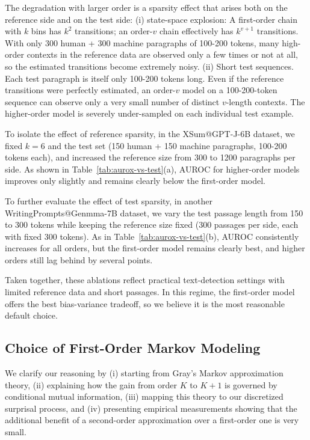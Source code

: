 \documentclass{article}
\theoremstyle{plain}
\theoremstyle{definition}
\theoremstyle{remark}
\begin{document}
The degradation with larger order is a sparsity effect that arises both on the reference side and on the test side: (i) state-space explosion: A first-order chain with $k$ bins has $k^2$ transitions; an order-$v$ chain effectively has $k^{v+1}$ transitions. With only 300 human + 300 machine paragraphs of 100-200 tokens, many high-order contexts in the reference data are observed only a few times or not at all, so the estimated transitions become extremely noisy. (ii) Short test sequences. Each test paragraph is itself only 100-200 tokens long. Even if the reference transitions were perfectly estimated, an order-$v$ model on a 100-200-token sequence can observe only a very small number of distinct 
$v$-length contexts. The higher-order model is severely under-sampled on each individual test example.

To isolate the effect of reference sparsity, in the XSum@GPT-J-6B dataset, we fixed $k=6$ and the test set (150 human + 150 machine paragraphs, 100-200 tokens each), and increased the reference size from 300 to 1200 paragraphs per side. As shown in Table~\ref{tab:aurox-vs-test}(a), AUROC for higher-order models improves only slightly and remains clearly below the first-order model.

To further evaluate the effect of test sparsity, in another WritingPrompts@Genmma-7B dataset, we vary the test passage length from 150 to 300 tokens while keeping the reference size fixed (300 passages per side, each with fixed 300 tokens). As in Table~\ref{tab:aurox-vs-test}(b), AUROC consistently increases for all orders, but the first-order model remains clearly best, and higher orders still lag behind by several points. 

Taken together, these ablations reflect practical text-detection settings with limited reference data and short passages. In this regime, the first-order model offers the best bias-variance tradeoff, so we believe it is the most reasonable default choice.

\subsection{Choice of First-Order Markov Modeling} \label{sec:theo-justification}
We clarify our reasoning by (i) starting from Gray's Markov approximation theory, (ii) explaining how the gain from order
$K$ to $K+1$ is governed by conditional mutual information, (iii) mapping this theory to our discretized surprisal process, and (iv) presenting empirical measurements showing that the additional benefit of a second-order approximation over a first-order one is very small.
\end{document}
